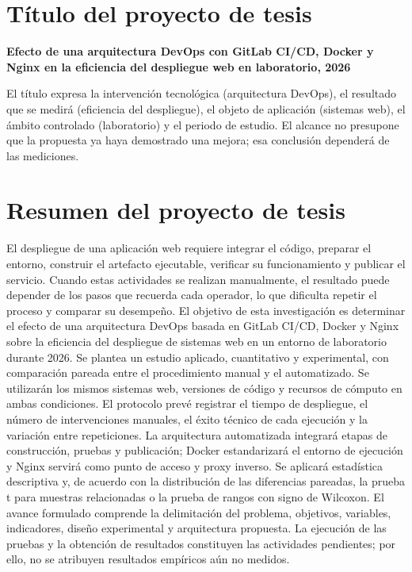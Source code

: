 \documentclass[12pt,a4paper]{article}
\begin{document}
\section{Título del proyecto de tesis}

\begin{center}
\textbf{Efecto de una arquitectura DevOps con GitLab CI/CD, Docker y Nginx en la eficiencia del despliegue web en laboratorio, 2026}
\end{center}

El título expresa la intervención tecnológica (arquitectura DevOps), el resultado que se medirá (eficiencia del despliegue), el objeto de aplicación (sistemas web), el ámbito controlado (laboratorio) y el periodo de estudio. El alcance no presupone que la propuesta ya haya demostrado una mejora; esa conclusión dependerá de las mediciones.

\section{Resumen del proyecto de tesis}

El despliegue de una aplicación web requiere integrar el código, preparar el entorno, construir el artefacto ejecutable, verificar su funcionamiento y publicar el servicio. Cuando estas actividades se realizan manualmente, el resultado puede depender de los pasos que recuerda cada operador, lo que dificulta repetir el proceso y comparar su desempeño. El objetivo de esta investigación es determinar el efecto de una arquitectura DevOps basada en GitLab CI/CD, Docker y Nginx sobre la eficiencia del despliegue de sistemas web en un entorno de laboratorio durante 2026. Se plantea un estudio aplicado, cuantitativo y experimental, con comparación pareada entre el procedimiento manual y el automatizado. Se utilizarán los mismos sistemas web, versiones de código y recursos de cómputo en ambas condiciones. El protocolo prevé registrar el tiempo de despliegue, el número de intervenciones manuales, el éxito técnico de cada ejecución y la variación entre repeticiones. La arquitectura automatizada integrará etapas de construcción, pruebas y publicación; Docker estandarizará el entorno de ejecución y Nginx servirá como punto de acceso y proxy inverso. Se aplicará estadística descriptiva y, de acuerdo con la distribución de las diferencias pareadas, la prueba t para muestras relacionadas o la prueba de rangos con signo de Wilcoxon. El avance formulado comprende la delimitación del problema, objetivos, variables, indicadores, diseño experimental y arquitectura propuesta. La ejecución de las pruebas y la obtención de resultados constituyen las actividades pendientes; por ello, no se atribuyen resultados empíricos aún no medidos.
\end{document}
